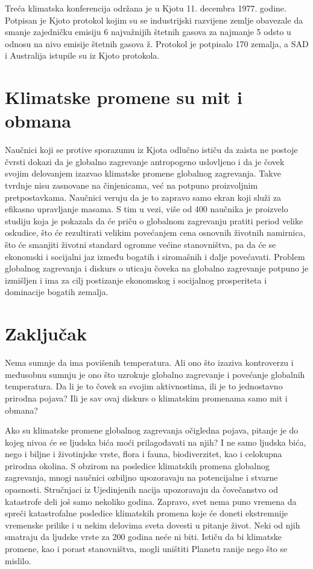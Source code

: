 \documentclass[a4paper]{article}
\begin{document}
 Treća klimatska konferencija održana je u Kjotu 11. decembra 1977. godine. Potpisan je Kjoto protokol kojim su se industrijski razvijene zemlje obavezale da smanje zajedničku emisiju 6 najvažnijih štetnih gasova za najmanje 5 odsto u odnosu na nivo emisije štetnih gasova ž. Protokol je potpisalo 170 zemalja, a SAD i Australija istupile su iz Kjoto protokola.

\section{Klimatske promene su mit i obmana}
\label{sec:klimatske_promene_su_mit_i_obmana}
Naučnici koji se protive sporazumu iz Kjota odlučno ističu da zaista ne postoje čvrsti dokazi da je globalno zagrevanje antropogeno uslovljeno i da je čovek svojim delovanjem izazvao klimatske promene globalnog zagrevanja. Takve tvrdnje nisu zasnovane na činjenicama, već na potpuno proizvoljnim pretpostavkama. Naučnici veruju da je to zapravo samo ekran koji služi za efikasno upravljanje masama. S tim u vezi, više od 400 naučnika je proizvelo studiju koja je pokazala da će priču o globalnom zagrevanju pratiti period velike oskudice, što će rezultirati velikim povećanjem cena osnovnih životnih namirnica, što će smanjiti životni standard ogromne većine stanovništva, pa da će se ekonomski i socijalni jaz između bogatih i siromašnih i dalje povećavati.  Problem globalnog zagrevanja i diskurs o uticaju čoveka na globalno zagrevanje potpuno je izmišljen i ima za cilj postizanje ekonomskog i socijalnog prosperiteta i dominacije bogatih zemalja.

\section{Zaključak}
\label{sec:zaključak}

Nema sumnje da ima povišenih temperatura. Ali ono što izaziva kontroverzu i međusobnu sumnju je ono što uzrokuje globalno zagrevanje i povećanje globalnih temperatura. Da li je to čovek sa svojim aktivnostima, ili je to jednostavno prirodna pojava? Ili je sav ovaj diskurs o klimatskim promenama samo mit i obmana?

Ako su klimatske promene globalnog zagrevanja očigledna pojava, pitanje je do kojeg nivoa će se ljudska bića moći prilagođavati na njih? I ne samo ljudska bića, nego i biljne i životinjske vrste, flora i fauna, biodiverzitet, kao i celokupna prirodna okolina.
S obzirom na posledice klimatskih promena globalnog zagrevanja, mnogi naučnici ozbiljno upozoravaju na potencijalne i stvarne opasnosti. Stručnjaci iz Ujedinjenih nacija upozoravaju da čovečanstvo od katastrofe deli još samo nekoliko godina. Zapravo, svet nema puno vremena da spreči katastrofalne posledice klimatskih promena koje će doneti ekstremnije vremenske prilike i u nekim delovima sveta dovesti u pitanje život. Neki od njih smatraju da ljudske vrste za 200 godina neće ni biti. Ističu da bi klimatske promene, kao i porast stanovništva, mogli uništiti Planetu ranije nego što se mislilo. 
\end{document}
